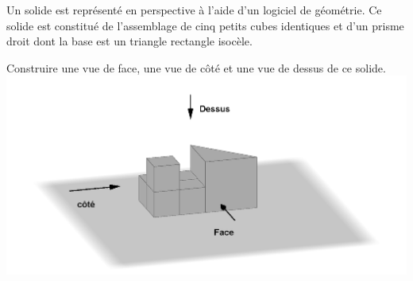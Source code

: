 
Un solide est représenté en perspective à l’aide d’un logiciel de géométrie. Ce solide est constitué de l’assemblage de cinq petits cubes identiques et d’un prisme droit dont la base est un triangle rectangle isocèle.

\medskip

Construire une vue de face, une vue de côté et une vue de dessus de ce solide.\\
\includegraphics[scale=0.25]{RepS-flash2.png} 

